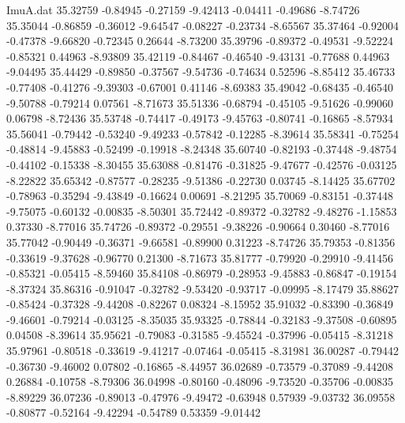 \begin{filecontents}{ImuA.dat}
  35.32759   -0.84945   -0.27159   -9.42413   -0.04411   -0.49686   -8.74726
  35.35044   -0.86859   -0.36012   -9.64547   -0.08227   -0.23734   -8.65567
  35.37464   -0.92004   -0.47378   -9.66820   -0.72345    0.26644   -8.73200
  35.39796   -0.89372   -0.49531   -9.52224   -0.85321    0.44963   -8.93809
  35.42119   -0.84467   -0.46540   -9.43131   -0.77688    0.44963   -9.04495
  35.44429   -0.89850   -0.37567   -9.54736   -0.74634    0.52596   -8.85412
  35.46733   -0.77408   -0.41276   -9.39303   -0.67001    0.41146   -8.69383
  35.49042   -0.68435   -0.46540   -9.50788   -0.79214    0.07561   -8.71673
  35.51336   -0.68794   -0.45105   -9.51626   -0.99060    0.06798   -8.72436
  35.53748   -0.74417   -0.49173   -9.45763   -0.80741   -0.16865   -8.57934
  35.56041   -0.79442   -0.53240   -9.49233   -0.57842   -0.12285   -8.39614
  35.58341   -0.75254   -0.48814   -9.45883   -0.52499   -0.19918   -8.24348
  35.60740   -0.82193   -0.37448   -9.48754   -0.44102   -0.15338   -8.30455
  35.63088   -0.81476   -0.31825   -9.47677   -0.42576   -0.03125   -8.22822
  35.65342   -0.87577   -0.28235   -9.51386   -0.22730    0.03745   -8.14425
  35.67702   -0.78963   -0.35294   -9.43849   -0.16624    0.00691   -8.21295
  35.70069   -0.83151   -0.37448   -9.75075   -0.60132   -0.00835   -8.50301
  35.72442   -0.89372   -0.32782   -9.48276   -1.15853    0.37330   -8.77016
  35.74726   -0.89372   -0.29551   -9.38226   -0.90664    0.30460   -8.77016
  35.77042   -0.90449   -0.36371   -9.66581   -0.89900    0.31223   -8.74726
  35.79353   -0.81356   -0.33619   -9.37628   -0.96770    0.21300   -8.71673
  35.81777   -0.79920   -0.29910   -9.41456   -0.85321   -0.05415   -8.59460
  35.84108   -0.86979   -0.28953   -9.45883   -0.86847   -0.19154   -8.37324
  35.86316   -0.91047   -0.32782   -9.53420   -0.93717   -0.09995   -8.17479
  35.88627   -0.85424   -0.37328   -9.44208   -0.82267    0.08324   -8.15952
  35.91032   -0.83390   -0.36849   -9.46601   -0.79214   -0.03125   -8.35035
  35.93325   -0.78844   -0.32183   -9.37508   -0.60895    0.04508   -8.39614
  35.95621   -0.79083   -0.31585   -9.45524   -0.37996   -0.05415   -8.31218
  35.97961   -0.80518   -0.33619   -9.41217   -0.07464   -0.05415   -8.31981
  36.00287   -0.79442   -0.36730   -9.46002    0.07802   -0.16865   -8.44957
  36.02689   -0.73579   -0.37089   -9.44208    0.26884   -0.10758   -8.79306
  36.04998   -0.80160   -0.48096   -9.73520   -0.35706   -0.00835   -8.89229
  36.07236   -0.89013   -0.47976   -9.49472   -0.63948    0.57939   -9.03732
  36.09558   -0.80877   -0.52164   -9.42294   -0.54789    0.53359   -9.01442

\end{filecontents}

